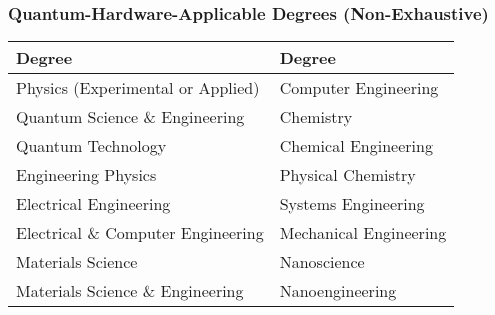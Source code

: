 \documentclass[aspectratio=169]{beamer}
\newcommand{\tabletext}{\small}
\begin{document}
\begin{frame}[t]
  \frametitle{Quantum-Hardware-Applicable Degrees (Non-Exhaustive)}
  \centering
  {%
    \tabletext
    \setlength{\tabcolsep}{6pt}%
    \renewcommand{\arraystretch}{1.2}%
    \begin{tabularx}{\linewidth}{>{\RaggedRight\arraybackslash}X >{\RaggedRight\arraybackslash}X}
      \toprule
      \textbf{Degree} & \textbf{Degree} \\
      \midrule
      Physics (Experimental or Applied)       & Computer Engineering \\
      Quantum Science \& Engineering          & Chemistry \\
      Quantum Technology                      & Chemical Engineering \\
      Engineering Physics                     & Physical Chemistry \\
      Electrical Engineering                  & Systems Engineering \\
      Electrical \& Computer Engineering      & Mechanical Engineering \\
      Materials Science                       & Nanoscience \\
      Materials Science \& Engineering        & Nanoengineering \\
      \bottomrule
    \end{tabularx}
  }%
\end{frame}
\end{document}

